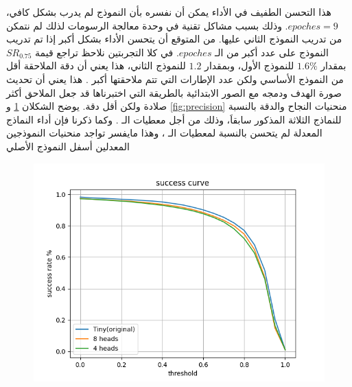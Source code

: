 هذا التحسن الطفيف في الأداء يمكن أن نفسره بأن النموذج لم يدرب بشكل كافي،
$epoches = 9$.
وذلك بسبب مشاكل تقنية في وحدة معالجة الرسومات 
لذلك لم نتمكن من تدريب النموذج الثاني عليها.
\newline
من المتوقع أن يتحسن الأداء بشكل أكبر إذا تم تدريب النموذج على عدد أكبر من الـ
$epoches$.
\newline
في كلا التجربتين نلاحظ تراجع قيمة 
$SR_{0.75}$
بمقدار 
$1.6\%$
للنموذج الأول، وبمقدار 
$1.2$
للنموذج الثاني، هذا يعني أن دقة الملاحقة أقل من النموذج الأساسي ولكن عدد الإطارات التي تتم ملاحقتها أكبر . هذا يعني أن تحديث صورة الهدف ودمجه مع الصور الابتدائية بالطريقة التي اختبرناها قد جعل الملاحق أكثر صلادة ولكن أقل دقة.
\newline
يوضح الشكلان
\ref{fig:successCurve}
و
\ref{fig:precision}
منحنيات النجاح والدقة بالنسبة للنماذج الثلاثة المذكور سابقاَ، وذلك من أجل معطيات الـ
.
وكما ذكرنا فإن أداء النماذج المعدلة لم يتحسن بالنسبة لمعطيات الـ
،
وهذا مايفسر تواجد منحنيات النموذجين المعدلين
أسفل النموذج الأصلي

\begin{figure}[H]
	\centerline{\includegraphics[width=\textwidth]{charts/successCurve}}
	\caption{}
	\label{fig:successCurve}
\end{figure}

